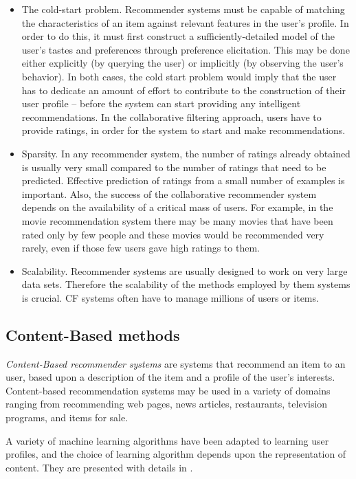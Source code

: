 \documentclass[11pt]{amsart}
\begin{document}
\begin{itemize}
  \item The cold-start problem. Recommender systems must be capable of matching the characteristics of an item against relevant features in the user's profile. In order to do this, it must first construct a sufficiently-detailed model of the user's tastes and preferences through preference elicitation. This may be done either explicitly (by querying the user) or implicitly (by observing the user's behavior). In both cases, the cold start problem would imply that the user has to dedicate an amount of effort to contribute to the construction of their user profile – before the system can start providing any intelligent recommendations.
  In the collaborative filtering approach, users have to provide ratings, in order for the system to start and make recommendations.
  \item Sparsity. In any recommender system, the number of ratings already obtained is usually very small compared to the number of ratings that need to be predicted. Effective prediction of ratings from a small number of examples is important. Also, the success of the collaborative recommender system depends on the availability of a critical mass of users. For example, in the movie recommendation system there may be many movies that have been rated only by few people and these movies would be recommended very rarely, even if those few users gave high ratings to them.
  \item Scalability. Recommender systems are usually designed to work on very large data sets. Therefore the scalability of the methods employed by them systems is crucial. CF systems often have to manage millions of users or items.
\end{itemize}
 

\subsection{Content-Based methods}
\label{content_based_methods}
\emph{Content-Based recommender systems} are systems that recommend an item to an user, based upon a description of the item and a profile of the user's interests. Content-based recommendation systems may be used in a variety of domains ranging from recommending web pages, news articles, restaurants, television programs, and items for sale.

A variety of machine learning algorithms have been adapted to learning user profiles, and the choice of learning algorithm depends upon the representation of content. They are presented with details in \cite{content_based_reco_syst}.
\end{document}
